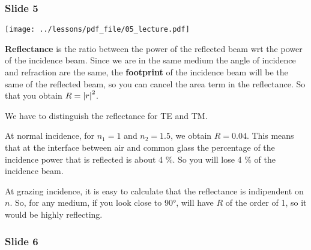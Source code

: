 \documentclass[../main/main.tex]{subfiles}
\begin{document}
\subsubsection*{Slide 5}

\begin{minipage}[]{0.5\linewidth}
\centering
\texttt{[image: ../lessons/pdf\_file/05\_lecture.pdf]}
\end{minipage}
\hspace{0.3cm}\vspace{0.3cm}
\begin{minipage}[c]{0.47\linewidth}

\textbf{Reflectance} is the ratio between the power of the reflected beam wrt the power of the incidence beam. Since we are in the same medium the angle of incidence and refraction are the same, the \textbf{footprint} of the incidence beam will be the same of the reflected beam, so you can cancel the area term in the reflectance. So that you obtain \( R = \abs{r}^2  \).

We have to distinguish the reflectance for TE and TM.

At normal incidence, for \( n_1=1 \) and \( n_2 = 1.5 \), we obtain \( R=0.04 \). This means that at the interface between air and common glass the percentage of the incidence power that is reflected is about 4 $\%$. So you will lose 4 $\%$ of the incidence beam.

At grazing incidence, it is easy to calculate that the reflectance is indipendent on \( n \). So, for any medium, if you look close to 90°, will have \( R \) of the order of 1, so it would be highly reflecting.

\end{minipage}

\subsubsection*{Slide 6}
\end{document}
